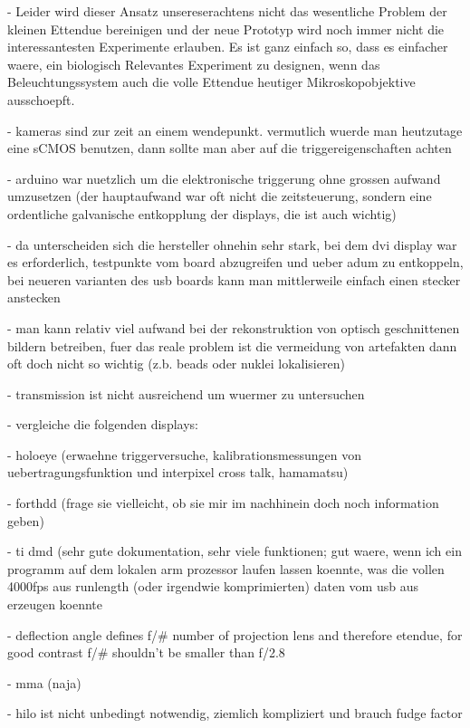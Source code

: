 \documentclass[oneside,a4paper,12pt,BCOR20mm,DIV14]{scrbook} %
\begin{document}
  - Leider wird dieser Ansatz unsereserachtens nicht das wesentliche
    Problem der kleinen Ettendue bereinigen und der neue Prototyp wird
    noch immer nicht die interessantesten Experimente erlauben. Es ist
    ganz einfach so, dass es einfacher waere, ein biologisch
    Relevantes Experiment zu designen, wenn das Beleuchtungssystem
    auch die volle Ettendue heutiger Mikroskopobjektive ausschoepft.

- kameras sind zur zeit an einem wendepunkt. vermutlich wuerde man
  heutzutage eine sCMOS benutzen, dann sollte man aber auf die
  triggereigenschaften achten

- arduino war nuetzlich um die elektronische triggerung ohne grossen
  aufwand umzusetzen (der hauptaufwand war oft nicht die
  zeitsteuerung, sondern eine ordentliche galvanische entkopplung der
  displays, die ist auch wichtig)

  - da unterscheiden sich die hersteller ohnehin sehr stark, bei dem
    dvi display war es erforderlich, testpunkte vom board abzugreifen
    und ueber adum zu entkoppeln, bei neueren varianten des usb boards
    kann man mittlerweile einfach einen stecker anstecken

- man kann relativ viel aufwand bei der rekonstruktion von optisch
  geschnittenen bildern betreiben, fuer das reale problem ist die
  vermeidung von artefakten dann oft doch nicht so wichtig (z.b. beads
  oder nuklei lokalisieren)

- transmission ist nicht ausreichend um wuermer zu untersuchen  

- vergleiche die folgenden displays:

  - holoeye (erwaehne triggerversuche, kalibrationsmessungen von
    uebertragungsfunktion und interpixel cross talk, hamamatsu)

  - forthdd (frage sie vielleicht, ob sie mir im nachhinein doch noch
    information geben)

  - ti dmd (sehr gute dokumentation, sehr viele funktionen; gut waere,
    wenn ich ein programm auf dem lokalen arm prozessor laufen lassen
    koennte, was die vollen 4000fps aus runlength (oder irgendwie
    komprimierten) daten vom usb aus erzeugen koennte

    - deflection angle defines f/\# number of projection lens and
      therefore etendue, for good contrast f/\# shouldn't be smaller
      than f/2.8

  - mma (naja)

- hilo ist nicht unbedingt notwendig, ziemlich kompliziert und brauch
  fudge factor
\end{document}
